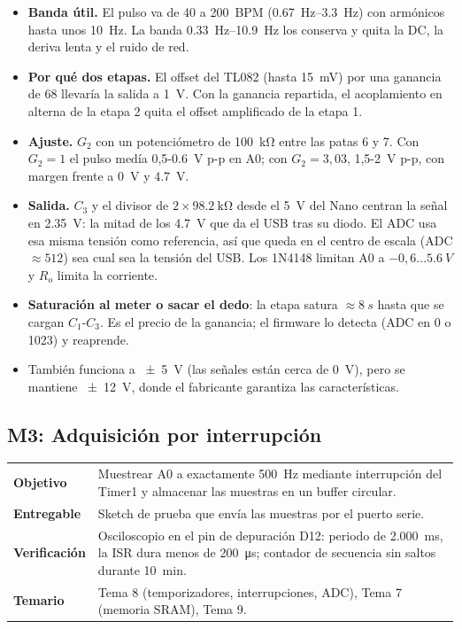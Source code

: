 \documentclass[11pt,a4paper]{article}
\newcommand{\modinfo}[4]{%
  \begin{center}\small
  \renewcommand{\arraystretch}{1.25}
  \begin{tabularx}{\textwidth}{>{\bfseries\color{navy}}lX}
  \toprule
  Objetivo     & #1 \\
  Entregable   & #2 \\
  Verificación & #3 \\
  Temario      & #4 \\
  \bottomrule
  \end{tabularx}
  \end{center}}
\begin{document}
\begin{itemize}[leftmargin=1.2em,itemsep=2pt,topsep=2pt]
  \item \textbf{Banda útil.} El pulso va de 40 a \qty{200}{BPM} (\qtyrange{0.67}{3.3}{Hz})
        con armónicos hasta unos \qty{10}{Hz}. La banda \qtyrange{0.33}{10.9}{Hz} los conserva y
        quita la DC, la deriva lenta y el ruido de red.
  \item \textbf{Por qué dos etapas.} El offset del TL082 (hasta \qty{15}{mV}) por una ganancia
        de 68 llevaría la salida a \qty{1}{V}. Con la ganancia repartida, el acoplamiento en
        alterna de la etapa 2 quita el offset amplificado de la etapa 1.
  \item \textbf{Ajuste.} $G_2$ con un potenciómetro de \qty{100}{\kilo\ohm} entre las patas 6
        y 7. Con $G_2 = 1$ el pulso medía 0,5-\qty{0.6}{V} p-p en A0; con $G_2 = 3{,}03$,
        1,5-\qty{2}{V} p-p, con margen frente a \qty{0}{V} y \qty{4.7}{V}.
  \item \textbf{Salida.} $C_3$ y el divisor de $2\times\qty{98.2}{\kilo\ohm}$ desde el
        \qty{5}{V} del Nano centran la señal en \qty{2.35}{V}: la mitad de los \qty{4.7}{V} que
        da el USB tras su diodo. El ADC usa esa misma tensión como referencia, así que queda
        en el centro de escala (ADC $\approx 512$) sea cual sea la tensión del USB. Los
        1N4148 limitan A0 a $-0{,}6\ldots\qty{5.6}{V}$ y $R_o$ limita la corriente.
  \item \textbf{Saturación al meter o sacar el dedo}: la etapa satura $\approx\qty{8}{s}$
        hasta que se cargan $C_1$-$C_3$. Es el precio de la ganancia; el firmware lo detecta
        (ADC en 0 o 1023) y reaprende.
  \item También funciona a \qty{\pm 5}{V} (las señales están cerca de \qty{0}{V}), pero se
        mantiene \qty{\pm 12}{V}, donde el fabricante garantiza las características.
\end{itemize}

\subsection{M3: Adquisición por interrupción}

\modinfo{Muestrear A0 a exactamente \qty{500}{Hz} mediante interrupción del Timer1 y
almacenar las muestras en un buffer circular.}
{Sketch de prueba que envía las muestras por el puerto serie.}
{Osciloscopio en el pin de depuración D12: periodo de \qty{2.000}{ms}, la ISR dura menos de
\qty{200}{\micro s}; contador de secuencia sin saltos durante \qty{10}{min}.}
{Tema 8 (temporizadores, interrupciones, ADC), Tema 7 (memoria SRAM), Tema 9.}
\end{document}
